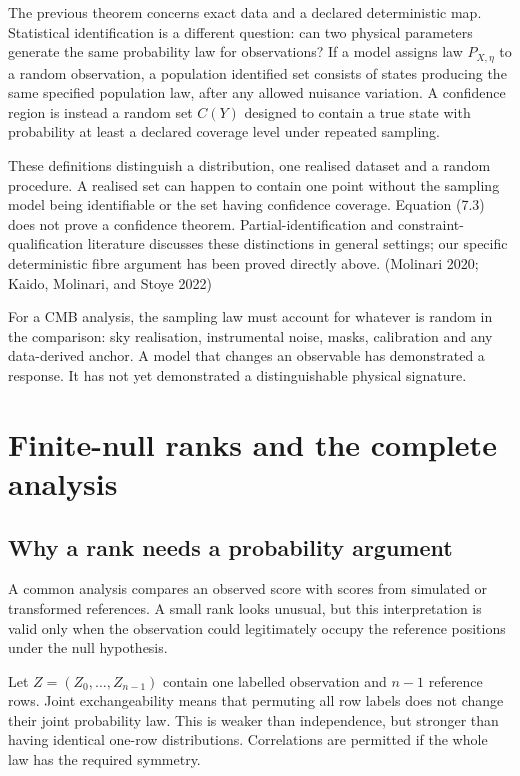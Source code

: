 \documentclass[
  11pt,
  a4paper]{article}
\begin{document}
The previous theorem concerns exact data and a declared deterministic map. Statistical identification is a different question: can two physical parameters generate the same probability law for observations? If a model assigns law \(P_{X,\eta}\) to a random observation, a population identified set consists of states producing the same specified population law, after any allowed nuisance variation. A confidence region is instead a random set \(C(Y)\) designed to contain a true state with probability at least a declared coverage level under repeated sampling.

These definitions distinguish a distribution, one realised dataset and a random procedure. A realised set can happen to contain one point without the sampling model being identifiable or the set having confidence coverage. Equation (7.3) does not prove a confidence theorem. Partial-identification and constraint-qualification literature discusses these distinctions in general settings; our specific deterministic fibre argument has been proved directly above. (Molinari 2020; Kaido, Molinari, and Stoye 2022)

For a CMB analysis, the sampling law must account for whatever is random in the comparison: sky realisation, instrumental noise, masks, calibration and any data-derived anchor. A model that changes an observable has demonstrated a response. It has not yet demonstrated a distinguishable physical signature.

\hypertarget{finite-null-ranks-and-the-complete-analysis}{%
\section{Finite-null ranks and the complete analysis}\label{finite-null-ranks-and-the-complete-analysis}}

\hypertarget{why-a-rank-needs-a-probability-argument}{%
\subsection{Why a rank needs a probability argument}\label{why-a-rank-needs-a-probability-argument}}

A common analysis compares an observed score with scores from simulated or transformed references. A small rank looks unusual, but this interpretation is valid only when the observation could legitimately occupy the reference positions under the null hypothesis.

Let \(Z=(Z_0,\ldots,Z_{n-1})\) contain one labelled observation and \(n-1\) reference rows. Joint exchangeability means that permuting all row labels does not change their joint probability law. This is weaker than independence, but stronger than having identical one-row distributions. Correlations are permitted if the whole law has the required symmetry.
\end{document}
